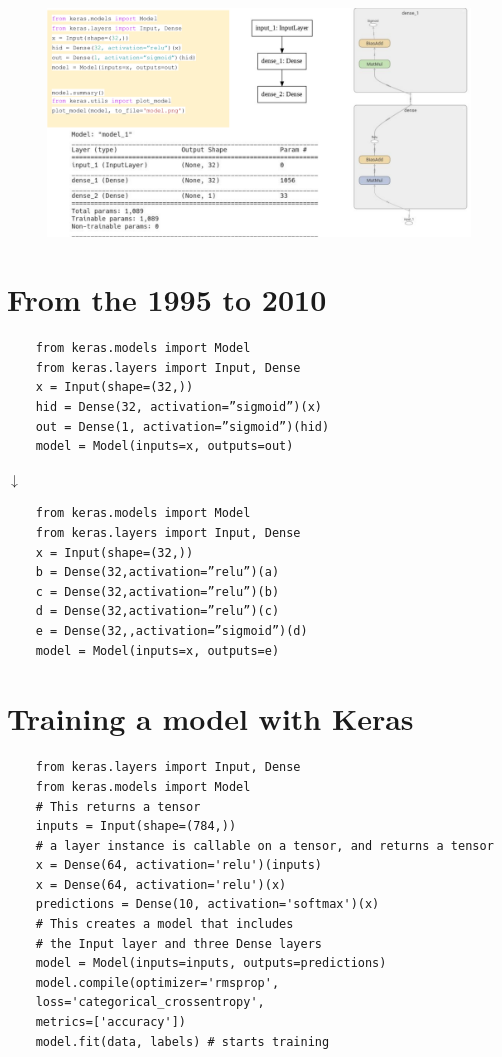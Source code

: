 \begin{figure}[ht]
	\centering
	\includegraphics[width=1\linewidth]{figure_ml/modernized_mlp.png}
\end{figure}
\FloatBarrier

\section{From the 1995 to 2010}

\begin{verbatim}
	from keras.models import Model
	from keras.layers import Input, Dense
	x = Input(shape=(32,))
	hid = Dense(32, activation=”sigmoid”)(x)
	out = Dense(1, activation=”sigmoid”)(hid)
	model = Model(inputs=x, outputs=out)
\end{verbatim}

\begin{center}
	$\downarrow$
\end{center}

\begin{verbatim}
	from keras.models import Model
	from keras.layers import Input, Dense
	x = Input(shape=(32,))
	b = Dense(32,activation=”relu”)(a)
	c = Dense(32,activation=”relu”)(b)
	d = Dense(32,activation=”relu”)(c)
	e = Dense(32,,activation=”sigmoid”)(d)
	model = Model(inputs=x, outputs=e)
\end{verbatim}

\section{Training a model with Keras}

\begin{verbatim}
	from keras.layers import Input, Dense
	from keras.models import Model
	# This returns a tensor
	inputs = Input(shape=(784,))
	# a layer instance is callable on a tensor, and returns a tensor
	x = Dense(64, activation='relu')(inputs)
	x = Dense(64, activation='relu')(x)
	predictions = Dense(10, activation='softmax')(x)
	# This creates a model that includes
	# the Input layer and three Dense layers
	model = Model(inputs=inputs, outputs=predictions)
	model.compile(optimizer='rmsprop',
	loss='categorical_crossentropy',
	metrics=['accuracy'])
	model.fit(data, labels) # starts training
\end{verbatim}



